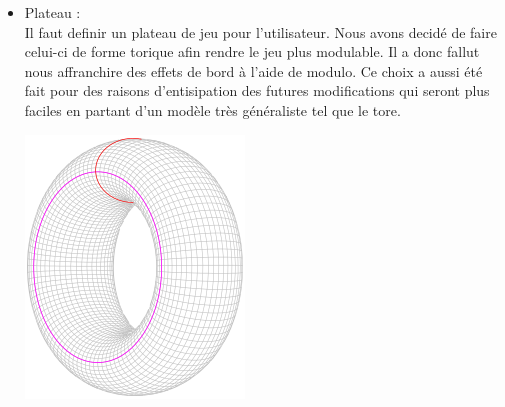 \documentclass{article}
\begin{document}
\begin{itemize}
\begin{itemize}
\begin{center}
\begin{multicols}{2}
        \end{multicols}
        \end{center} 
        Le type de couleur de la case :
        \begin{center}
            NO-COLOR \hspace{1cm} WHITE \hspace{1cm} BLACK \\
        \end{center}
        L'occupant de la case :
        \begin{center}
            NO-SORT \hspace{2cm} SIMPLE-PAWN \\ 
        \end{center}
        Cette catégorie est voué à s'agrandir au vu de l'ajout de différentes sorte de pions par la suite. \\
        Egalement 
        \item Plateau : 
        \\
        Il faut definir un plateau de jeu pour l'utilisateur. Nous avons decidé de faire celui-ci de forme torique afin rendre le jeu plus modulable. Il a donc fallut nous affranchire des effets de bord à l'aide de modulo. Ce choix a aussi été fait pour des raisons d'entisipation des futures modifications qui seront plus faciles en partant d'un modèle très généraliste tel que le tore.\\
        \begin{center}
        \includegraphics[scale=0.3]{220px-Torus_cycles2.svg.png}
        \end{center}
        

\end{itemize}
\end{itemize}
\end{document}
